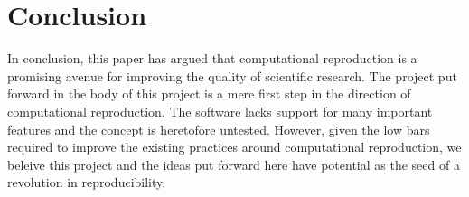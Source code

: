 \hypertarget{conclusion}{%
\section{Conclusion}\label{conclusion}}

In conclusion, this paper has argued that computational reproduction is a promising avenue for improving the quality of scientific research. The project put forward in the body of this project is a mere first step in the direction of computational reproduction. The software lacks support for many important features and the concept is heretofore untested. However, given the low bars required to improve the existing practices around computational reproduction, we beleive this project and the ideas put forward here have potential as the seed of a revolution in reproducibility.
